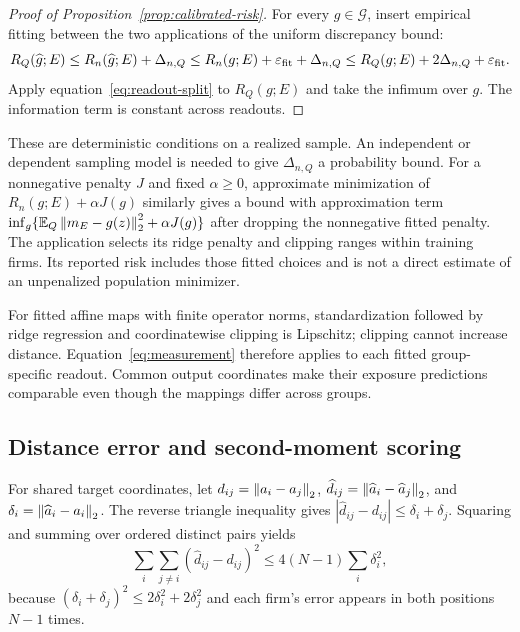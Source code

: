 \documentclass[11pt]{article}
\renewcommand{\lean}[1]{\ignorespaces}
\renewcommand{\leanok}{\ignorespaces}
\begin{document}
\begin{proof}[Proof of Proposition~\ref{prop:calibrated-risk}]
  For every $g\in\mathcal G$, insert empirical fitting between the two
  applications of the uniform discrepancy bound:
  \[
    R_Q(\widehat g;E)\le R_n(\widehat g;E)+\Delta_{n,Q}
    \le R_n(g;E)+\varepsilon_{\rm fit}+\Delta_{n,Q}
    \le R_Q(g;E)+2\Delta_{n,Q}+\varepsilon_{\rm fit}.
  \]
  Apply equation~\eqref{eq:readout-split} to $R_Q(g;E)$ and take the infimum
  over $g$. The information term is constant across readouts.
\end{proof}
These are deterministic conditions on a realized sample. An independent or
dependent sampling model is needed to give $\Delta_{n,Q}$ a probability bound.
For a nonnegative penalty $J$ and fixed $\alpha\ge0$, approximate
minimization of
$R_n(g;E)+\alpha J(g)$ similarly gives a bound with approximation term
$\inf_g\{\mathbb{E}_Q\left\lVert m_E-g(z)\right\rVert_2^2+\alpha J(g)\}$ after dropping the nonnegative
fitted penalty. The application selects its ridge penalty and clipping ranges
within training firms. Its reported risk includes those fitted choices and is
not a direct estimate of an unpenalized population minimizer.

For fitted affine maps with finite operator norms, standardization followed by
ridge regression and coordinatewise clipping is Lipschitz; clipping cannot
increase distance. Equation~\eqref{eq:measurement} therefore applies to each
fitted group-specific readout. Common output coordinates make their exposure
predictions comparable even though the mappings differ across groups.

\subsection{Distance error and second-moment scoring}
For shared target coordinates, let $d_{ij}=\left\lVert a_i-a_j\right\rVert_2$,
$\widehat d_{ij}=\left\lVert\widehat a_i-\widehat a_j\right\rVert_2$, and
$\delta_i=\left\lVert\widehat a_i-a_i\right\rVert_2$. The reverse triangle inequality gives
$|\widehat d_{ij}-d_{ij}|\le\delta_i+\delta_j$. Squaring and summing
over ordered
distinct pairs yields
\[
  \sum_i\sum_{j\ne i}{(\widehat d_{ij}-d_{ij})}^2
  \le4(N-1)\sum_i\delta_i^2,
\]
because ${(\delta_i+\delta_j)}^2\le2\delta_i^2+2\delta_j^2$ and each
firm's error
appears in both positions $N-1$ times.
\lean{FreeFoundations.Recovery.distance_error,
FreeFoundations.Recovery.pairwise_distance_error}\leanok{}
\end{document}
